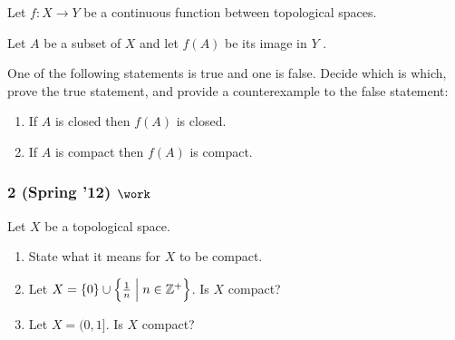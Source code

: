 \begin{problem}[?]

Let \(f : X \to Y\) be a continuous function between topological spaces.

Let \(A\) be a subset of \(X\) and let \(f (A)\) be its image in \(Y\) .

One of the following statements is true and one is false. Decide which
is which, prove the true statement, and provide a counterexample to the
false statement:

\begin{enumerate}
\def\labelenumi{\arabic{enumi}.}
\item
  If \(A\) is closed then \(f (A)\) is closed.
\item
  If \(A\) is compact then \(f (A)\) is compact.
\end{enumerate}

\end{problem}

\hypertarget{spring-12-work}{%
\subsubsection{\texorpdfstring{2 (Spring '12)
\(\work\)}{2 (Spring '12) \textbackslash work}}\label{spring-12-work}}

\begin{problem}[?]

Let \(X\) be a topological space.

\begin{enumerate}
\def\labelenumi{\alph{enumi}.}
\item
  State what it means for \(X\) to be compact.
\item
  Let
  \(X = \left\{{0}\right\} \cup \left\{{{1\over n} \mathrel{\Big|}n \in {\mathbb{Z}}^+ }\right\}\).
  Is \(X\) compact?
\item
  Let \(X = (0, 1]\). Is \(X\) compact?
\end{enumerate}

\end{problem}


